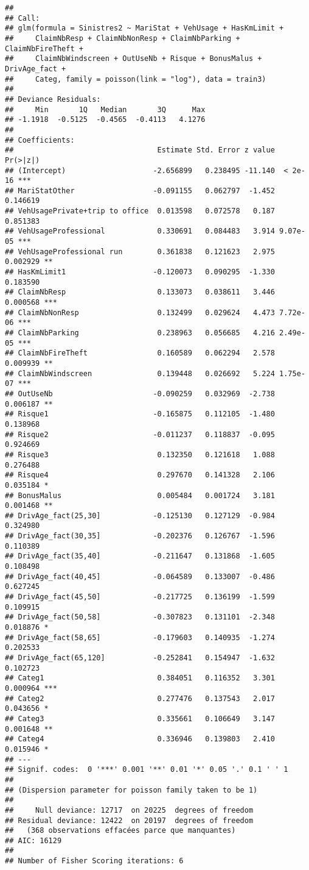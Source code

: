 \documentclass[
]{article}
\begin{document}
\begin{verbatim}
## 
## Call:
## glm(formula = Sinistres2 ~ MariStat + VehUsage + HasKmLimit + 
##     ClaimNbResp + ClaimNbNonResp + ClaimNbParking + ClaimNbFireTheft + 
##     ClaimNbWindscreen + OutUseNb + Risque + BonusMalus + DrivAge_fact + 
##     Categ, family = poisson(link = "log"), data = train3)
## 
## Deviance Residuals: 
##     Min       1Q   Median       3Q      Max  
## -1.1918  -0.5125  -0.4565  -0.4113   4.1276  
## 
## Coefficients:
##                                 Estimate Std. Error z value Pr(>|z|)    
## (Intercept)                    -2.656899   0.238495 -11.140  < 2e-16 ***
## MariStatOther                  -0.091155   0.062797  -1.452 0.146619    
## VehUsagePrivate+trip to office  0.013598   0.072578   0.187 0.851383    
## VehUsageProfessional            0.330691   0.084483   3.914 9.07e-05 ***
## VehUsageProfessional run        0.361838   0.121623   2.975 0.002929 ** 
## HasKmLimit1                    -0.120073   0.090295  -1.330 0.183590    
## ClaimNbResp                     0.133073   0.038611   3.446 0.000568 ***
## ClaimNbNonResp                  0.132499   0.029624   4.473 7.72e-06 ***
## ClaimNbParking                  0.238963   0.056685   4.216 2.49e-05 ***
## ClaimNbFireTheft                0.160589   0.062294   2.578 0.009939 ** 
## ClaimNbWindscreen               0.139448   0.026692   5.224 1.75e-07 ***
## OutUseNb                       -0.090259   0.032969  -2.738 0.006187 ** 
## Risque1                        -0.165875   0.112105  -1.480 0.138968    
## Risque2                        -0.011237   0.118837  -0.095 0.924669    
## Risque3                         0.132350   0.121618   1.088 0.276488    
## Risque4                         0.297670   0.141328   2.106 0.035184 *  
## BonusMalus                      0.005484   0.001724   3.181 0.001468 ** 
## DrivAge_fact(25,30]            -0.125130   0.127129  -0.984 0.324980    
## DrivAge_fact(30,35]            -0.202376   0.126767  -1.596 0.110389    
## DrivAge_fact(35,40]            -0.211647   0.131868  -1.605 0.108498    
## DrivAge_fact(40,45]            -0.064589   0.133007  -0.486 0.627245    
## DrivAge_fact(45,50]            -0.217725   0.136199  -1.599 0.109915    
## DrivAge_fact(50,58]            -0.307823   0.131101  -2.348 0.018876 *  
## DrivAge_fact(58,65]            -0.179603   0.140935  -1.274 0.202533    
## DrivAge_fact(65,120]           -0.252841   0.154947  -1.632 0.102723    
## Categ1                          0.384051   0.116352   3.301 0.000964 ***
## Categ2                          0.277476   0.137543   2.017 0.043656 *  
## Categ3                          0.335661   0.106649   3.147 0.001648 ** 
## Categ4                          0.336946   0.139803   2.410 0.015946 *  
## ---
## Signif. codes:  0 '***' 0.001 '**' 0.01 '*' 0.05 '.' 0.1 ' ' 1
## 
## (Dispersion parameter for poisson family taken to be 1)
## 
##     Null deviance: 12717  on 20225  degrees of freedom
## Residual deviance: 12422  on 20197  degrees of freedom
##   (368 observations effacées parce que manquantes)
## AIC: 16129
## 
## Number of Fisher Scoring iterations: 6
\end{verbatim}
\end{document}
